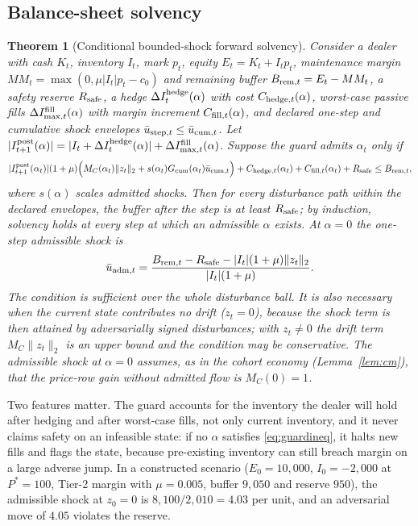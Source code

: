 \documentclass[12pt]{article}
\newtheorem{theorem}{Theorem}[section]
\theoremstyle{definition}
\theoremstyle{remark}
\begin{document}
\subsection{Balance-sheet solvency}

\begin{theorem}[Conditional bounded-shock forward solvency]\label{thm:forward}
Consider a dealer with cash $K_t$, inventory $I_t$, mark $p_t$, equity $E_t=K_t+I_tp_t$, maintenance margin $MM_t=\max(0,\mu|I_t|p_t-c_0)$ and remaining buffer $B_{{\rm rem},t}=E_t-MM_t$, a safety reserve $R_{\rm safe}$, a hedge $\Delta I^{\rm hedge}_t(\alpha)$ with cost $C_{{\rm hedge},t}(\alpha)$, worst-case passive fills $\Delta I^{\rm fill}_{\max,t}(\alpha)$ with margin increment $C_{{\rm fill},t}(\alpha)$, and declared one-step and cumulative shock envelopes $\bar u_{{\rm step},t}\le\bar u_{{\rm cum},t}$. Let $|I^{\rm post}_{t+1}(\alpha)|=|I_t+\Delta I^{\rm hedge}_t(\alpha)|+\Delta I^{\rm fill}_{\max,t}(\alpha)$. Suppose the guard admits $\alpha_t$ only if
\begin{equation}\label{eq:guardineq}
|I^{\rm post}_{t+1}(\alpha_t)|(1+\mu)\Bigl(M_{C}(\alpha_t)\|z_t\|_2+s(\alpha_t)G_{\rm cum}(\alpha_t)\bar u_{{\rm cum},t}\Bigr)+C_{{\rm hedge},t}(\alpha_t)+C_{{\rm fill},t}(\alpha_t)+R_{\rm safe}\le B_{{\rm rem},t},
\end{equation}
where $s(\alpha)$ scales admitted shocks. Then for every disturbance path within the declared envelopes, the buffer after the step is at least $R_{\rm safe}$; by induction, solvency holds at every step at which an admissible $\alpha$ exists. At $\alpha=0$ the one-step admissible shock is
\[
\bar u_{{\rm adm},t}=\frac{B_{{\rm rem},t}-R_{\rm safe}-|I_t|(1+\mu)\|z_t\|_2}{|I_t|(1+\mu)} .
\]
The condition is sufficient over the whole disturbance ball. It is also necessary when the current state contributes no drift ($z_t=0$), because the shock term is then attained by adversarially signed disturbances; with $z_t\neq0$ the drift term $M_C\|z_t\|_2$ is an upper bound and the condition may be conservative. The admissible shock at $\alpha=0$ assumes, as in the cohort economy (Lemma~\ref{lem:cm}), that the price-row gain without admitted flow is $M_C(0)=1$.
\end{theorem}

Two features matter. The guard accounts for the inventory the dealer will hold after hedging and after worst-case fills, not only current inventory, and it never claims safety on an infeasible state: if no $\alpha$ satisfies \eqref{eq:guardineq}, it halts new fills and flags the state, because pre-existing inventory can still breach margin on a large adverse jump. In a constructed scenario ($E_0=10{,}000$, $I_0=-2{,}000$ at $P^*=100$, Tier-2 margin with $\mu=0.005$, buffer $9{,}050$ and reserve $950$), the admissible shock at $z_0=0$ is $8{,}100/2{,}010=4.03$ per unit, and an adversarial move of $4.05$ violates the reserve.
\end{document}
